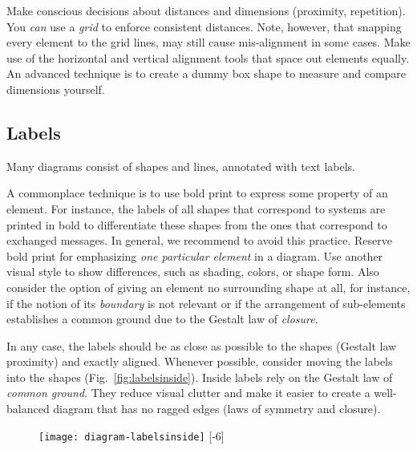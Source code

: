 Make conscious decisions about distances and dimensions (proximity, repetition). You \emph{can} use a \emph{grid} to enforce consistent distances. Note, however, that snapping every element to the grid lines, may still cause mis-alignment in some cases. Make use of the horizontal and vertical alignment tools that space out elements equally. An advanced technique is to create a dummy box shape to measure and compare dimensions yourself.

\subsection{Labels}

Many diagrams consist of shapes and lines, annotated with text labels.

A commonplace technique is to use bold print to express some property of an element. For instance, the labels of all shapes that correspond to systems are printed in bold to differentiate these shapes from the ones that correspond to exchanged  messages. In general, we recommend to avoid this practice. Reserve bold print for emphasizing \emph{one particular element} in a diagram. Use another visual style to show differences, such as shading, colors, or shape form. Also consider the option of giving an element no surrounding shape at all, for instance, if the notion of its \emph{boundary} is not relevant or if the arrangement of sub-elements establishes a common ground due to the Gestalt law of \emph{closure}.

In any case, the labels should be as close as possible to the shapes (Gestalt law proximity) and exactly aligned. Whenever possible, consider moving the labels into the shapes (Fig.~\ref{fig:labelsinside}). Inside labels rely on the Gestalt law of \emph{common ground}. They reduce visual clutter and make it easier to create a well-balanced diagram that has no ragged edges (laws of symmetry and closure). 

\begin{figure}[t]
\centering
\texttt{[image: diagram-labelsinside]}
[-6\baselineskip]
\end{figure}

